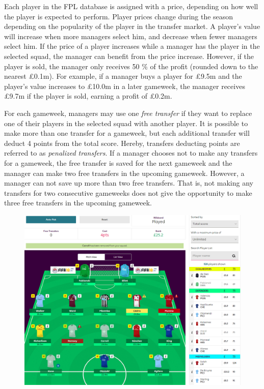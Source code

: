 Each player in the FPL database is assigned with a price, depending on how well the player is expected to perform. Player prices change during the season depending on the popularity of the player in the transfer market. A player's value will increase when more managers select him, and decrease when fewer managers select him. If the price of a player increases while a manager has the player in the selected squad, the manager can benefit from the price increase. However, if the player is sold, the manager only receives 50 \% of the profit (rounded down to the nearest \pounds 0.1m). For example, if a manager buys a player for \pounds 9.5m and the player's value increases to \pounds 10.0m in a later gameweek, the manager receives \pounds 9.7m if the player is sold, earning a profit of \pounds 0.2m.



\newpar

For each gameweek, managers may use one \textit{free transfer} if they want to replace one of their players in the selected squad  with another player. It is possible to make more than one transfer for a gameweek, but each additional transfer will deduct 4 points from the total score. Hereby, transfers deducting points are referred to as \textit{penalized transfers}. If a manager chooses not to make any transfers for a gameweek, the free transfer is saved for the next gameweek and the manager can make two free transfers in the upcoming gameweek. However, a manager can not save up more than two free transfers. That is, not making any transfers for two consecutive gameweeks does not give the opportunity to make three free transfers in the upcoming gameweek.


\begin{figure}[H]
\centering
\includegraphics[scale=0.35]{fig/fantasyteam1.png}
\label{Figure_2.1}
\label{fig:fantasy_bilde}
\end{figure}

